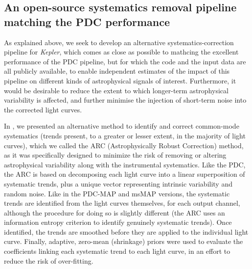 \documentclass[useAMS,usenatbib]{mn2e}
\begin{document}
\subsection{An open-source systematics removal pipeline matching the PDC performance}

As explained above, we seek to develop an alternative systematics-correction pipeline for \emph{Kepler}, which comes as close as possible to mathcing the excellent performance of the PDC pipeline, but for which the code and the input data are all publicly available, to enable independent estimates of the impact of this pipeline on different kinds of astrophysical signals of interest. Furthermore, it would be desirable to reduce the extent to which longer-term astrophysical variability is affected, and further minimise the injection of short-term noise into the corrected light curves.

In \citet[][hereafter Paper I]{rob+13}, we presented an alternative method to
identify and correct common-mode systematics (trends present, to a
greater or lesser extent, in the majority of light curves), which we
called the ARC (Astrophysically Robust Correction) method, as it was
specifically designed to minimize the risk of removing or altering
astrophysical variability along with the instrumental
systematics. Like the PDC, the ARC is based on decomposing each light
curve into a linear superposition of systematic trends, plus a unique
vector representing intrinsic variability and random noise. Like
in the PDC-MAP and msMAP versions, the systematic trends are identified from the light curves
themselves, for each output channel, although the procedure for doing so is slightly different (the ARC uses an information entropy criterion to identify genuinely systematic trends). Once identified, the trends are
smoothed before they are applied to the individual light curve. Finally, adaptive,
zero-mean (shrinkage) priors were used to evaluate the coefficients
linking each systematic trend to each light curve, in an effort to reduce the risk of over-fitting. 
\end{document}
